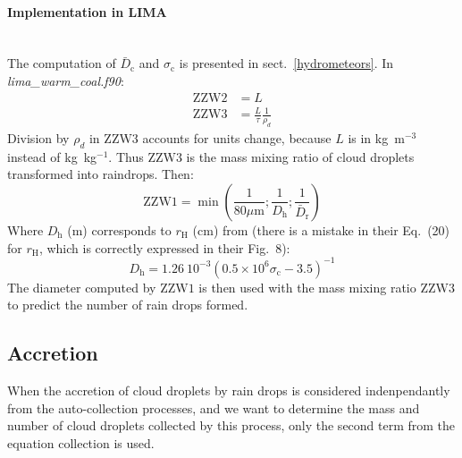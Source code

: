 {\paragraph{Implementation in LIMA}
~\\
The computation of $\bar{D}_{\mathrm{c}}$ and $\sigma_{\mathrm{c}}$ is presented in sect.\ \ref{hydrometeors}. In \emph{lima\_warm\_coal.f90}:
\begin{align}
\mathrm{ZZW2} &= L \\
\mathrm{ZZW3} &= \frac{L}{\tau} \frac{1}{\rho_d}
\end{align}
Division by $\rho_d$ in $\mathrm{ZZW3}$ accounts for units change, because $L$ is in kg~m$^{-3}$ instead of kg~kg$^{-1}$. Thus $\mathrm{ZZW3}$ is the mass mixing ratio of cloud droplets transformed into raindrops. Then:
\begin{equation}
\mathrm{ZZW1} = \min \left( \frac{1}{80 \mu\text{m}} ; \frac{1}{D_{\mathrm{h}}} ; \frac{1}{\bar{D}_{\mathrm{r}}} \right)
\end{equation}
Where $D_{\mathrm{h}}$ (m) corresponds to $r_{\mathrm{H}}$ (cm) from \citet{Berry1974} (there is a mistake in their Eq.~(20) for $r_{\mathrm{H}}$, which is correctly expressed in their Fig.~8):
\begin{equation}
D_{\mathrm{h}} = 1.26~10^{-3} \left( 0.5 \times 10^6 \sigma_{\mathrm{c}} - 3.5 \right)^{-1}
\end{equation}
The diameter computed by $\mathrm{ZZW1}$ is then used with the mass mixing ratio $\mathrm{ZZW3}$ to predict the number of rain drops formed.

\subsection{Accretion}

When the accretion of cloud droplets by rain drops is considered indenpendantly from the auto-collection processes, and we want to determine the mass and number of cloud droplets collected by this process, only the second term from the equation collection is used.

}
